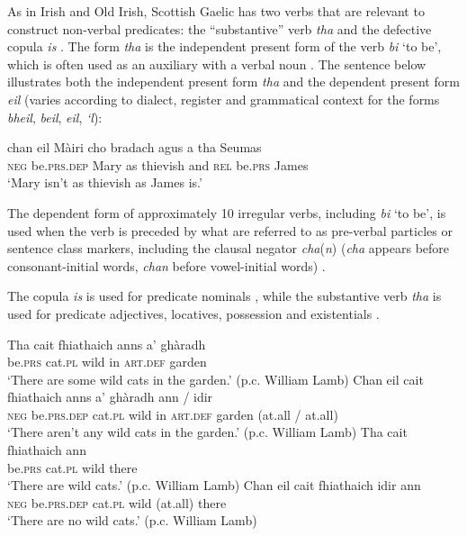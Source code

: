 \documentclass[output=paper]{langsci/langscibook}
\begin{document}
\begin{unindented}
As in Irish and Old Irish, Scottish Gaelic has two verbs that are relevant
to construct non-verbal predicates: the ``substantive'' verb \textit{tha} and the defective copula \textit{is} \citep[65]{Lamb2001}. The form \textit{tha} is the independent present form of the verb \textit{bi} `to be', which is often used as an auxiliary with a verbal noun \citep[54]{Lamb2001}. The sentence below illustrates both the independent present form \textit{tha} and the dependent present form \textit{eil} (varies according to dialect, register and grammatical context for the forms \textit{bheil}, \textit{beil}, \textit{eil}, \textit{‘l}): 
%
\begin{exe}\ex \gll chan eil Màiri cho bradach agus a tha Seumas \\
\textsc{neg}  be.\textsc{prs.dep} Mary  as    thievish and   \textsc{rel} be.\textsc{prs} James \\
    \glt `Mary isn't as thievish as James is.' \citep[42]{Lamb2001}
    \end{exe}

The dependent form of approximately 10 irregular verbs, including
\textit{bi} `to be', is used when the verb is preceded by what are referred
to as pre-verbal particles or sentence class markers, including the clausal
negator \textit{cha}(\textit{n}) (\textit{cha} appears before consonant-initial words, \textit{chan} before vowel-initial words) \citep[48--50]{Lamb2001}.

The copula \textit{is} is used for predicate nominals \citep[66--67]{Lamb2001}, while the substantive verb \textit{tha} is used for predicate adjectives, locatives, possession and existentials \citep[67--69]{Lamb2001}.
%
\begin{exe}\ex \gll Tha cait fhiathaich anns a’ ghàradh \\
be.\textsc{prs} cat.\textsc{pl} wild in \textsc{art.def} garden \\
    \glt `There are some wild cats in the garden.' (p.c. William Lamb)
\ex\label{ex:ieur-app-gaelic-nocatsingarden} \gll Chan eil cait fhiathaich anns a’ ghàradh {\op}ann / idir{\cp} \\
\textsc{neg}    be.\textsc{prs}.\textsc{dep} cat.\textsc{pl} wild          in     \textsc{art}.\textsc{def} garden (at.all / at.all) \\
    \glt `There aren't any wild cats in the garden.' (p.c. William Lamb)
\ex\label{ex:ieur-app-gaelic-yescatplease} 
\gll Tha cait fhiathaich ann \\
        be.\textsc{prs} cat.\textsc{pl}  wild there \\
    \glt `There are wild cats.' (p.c. William Lamb)
\ex\label{ex:ieur-app-gaelic-nocatsnow} \gll Chan  eil cait fhiathaich {\op}idir{\cp}    ann \\
\textsc{neg}    be.\textsc{prs.dep}  cat.\textsc{pl} wild           (at.all) there \\
    \glt `There are no wild cats.' (p.c. William Lamb)
\end{exe}


\end{unindented}
\end{document}
